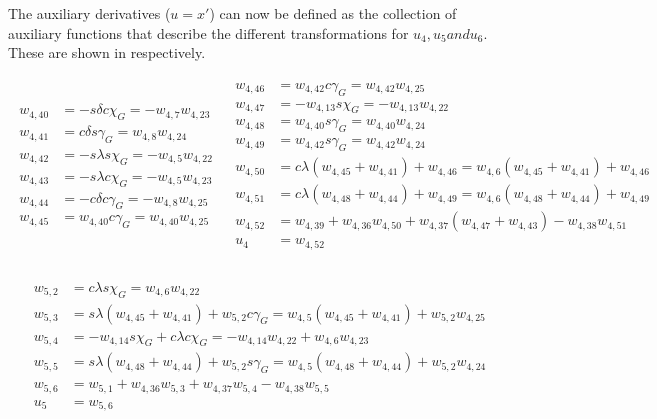The auxiliary derivatives ($u = x'$) can now be defined as the collection of auxiliary functions that describe the different transformations for $u_{4}, u_{5} and u_{6}$. These are shown in  respectively. 

\begin{align} \label{eq:u4AuxF}
\begin{split}
w_{4,40} &= -s\delta c\chi_{G} = -w_{4,7}w_{4,23} \\
w_{4,41} &= c\delta	s\gamma_{G} = w_{4,8}w_{4,24}\\
w_{4,42} &= -s\lambda s\chi_{G} = -w_{4,5}w_{4,22}\\
w_{4,43} &= -s\lambda c\chi_{G} = -w_{4,5}w_{4,23} \\
w_{4,44} &= -c\delta c\gamma_{G} = -w_{4,8}w_{4,25} \\
w_{4,45} &= w_{4,40} c\gamma_{G} = w_{4,40}w_{4,25} \\
\end{split}
&
\begin{split}
w_{4,46} &= w_{4,42} c\gamma_{G} = w_{4,42}w_{4,25} \\
w_{4,47} &= -w_{4,13} s\chi_{G} = -w_{4,13}w_{4,22} \\
w_{4,48} &= w_{4,40} s\gamma_{G} = w_{4,40}w_{4,24} \\
w_{4,49} &= w_{4,42} s\gamma_{G} = w_{4,42}w_{4,24} \\
w_{4,50} &= c\lambda \left(w_{4,45}+w_{4,41} \right) + w_{4,46} = 
w_{4,6}\left(w_{4,45}+w_{4,41} \right) + w_{4,46} \\
w_{4,51} &= c\lambda \left(w_{4,48}+w_{4,44} \right) + w_{4,49} =
w_{4,6}\left(w_{4,48}+w_{4,44} \right) + w_{4,49} \\
w_{4,52} &= w_{4,39} +w_{4,36}w_{4,50}+w_{4,37}\left(w_{4,47}+w_{4,43}\right)-w_{4,38}w_{4,51} \\
u_{4} &= w_{4,52} \\
\end{split}
\end{align}

\begin{align} \label{eq:u5AuxF}
\begin{split}
w_{5,2} &= c\lambda s\chi_{G} = w_{4,6}w_{4,22} \\
w_{5,3} &= s\lambda \left(w_{4,45}+w_{4,41}\right)+w_{5,2} c\gamma_{G} = w_{4,5} \left(w_{4,45}+w_{4,41}\right) +w_{5,2} w_{4,25} \\
w_{5,4} &= -w_{4,14} s\chi_{G}+c\lambda c\chi_{G} = -w_{4,14}w_{4,22}+w_{4,6}w_{4,23} \\
w_{5,5} &= s\lambda \left(w_{4,48}+w_{4,44}\right) + w_{5,2} s\gamma_{G} = w_{4,5} \left(w_{4,48}+w_{4,44}\right)+w_{5,2}w_{4,24} \\
w_{5,6} &= w_{5,1} + w_{4,36}w_{5,3}+w_{4,37}w_{5,4}-w_{4,38}w_{5,5} \\
u_{5} &= w_{5,6} \\
\end{split}
\end{align}

